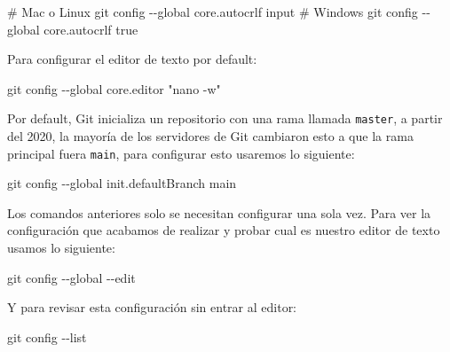\documentclass[
  spanish,
  12pt,
  letterpaper,
  DIV=11,
  numbers=noendperiod]{scrreprt}
\newenvironment{Shaded}{\begin{snugshade}}{\end{snugshade}}
\newcommand{\AttributeTok}[1]{\textcolor[rgb]{0.40,0.45,0.13}{#1}}
\newcommand{\CommentTok}[1]{\textcolor[rgb]{0.37,0.37,0.37}{#1}}
\newcommand{\FunctionTok}[1]{\textcolor[rgb]{0.28,0.35,0.67}{#1}}
\newcommand{\NormalTok}[1]{\textcolor[rgb]{0.00,0.23,0.31}{#1}}
\newcommand{\StringTok}[1]{\textcolor[rgb]{0.13,0.47,0.30}{#1}}
\begin{document}
\begin{Shaded}
\begin{Highlighting}[]
\CommentTok{\# Mac o Linux}
\FunctionTok{git}\NormalTok{ config }\AttributeTok{{-}{-}global}\NormalTok{ core.autocrlf input}
\CommentTok{\# Windows}
\FunctionTok{git}\NormalTok{ config }\AttributeTok{{-}{-}global}\NormalTok{ core.autocrlf true}
\end{Highlighting}
\end{Shaded}

Para configurar el editor de texto por default:

\begin{Shaded}
\begin{Highlighting}[]
\FunctionTok{git}\NormalTok{ config }\AttributeTok{{-}{-}global}\NormalTok{ core.editor }\StringTok{"nano {-}w"}
\end{Highlighting}
\end{Shaded}

Por default, Git inicializa un repositorio con una rama llamada
\texttt{master}, a partir del 2020, la mayoría de los servidores de Git
cambiaron esto a que la rama principal fuera \texttt{main}, para
configurar esto usaremos lo siguiente:

\begin{Shaded}
\begin{Highlighting}[]
\FunctionTok{git}\NormalTok{ config }\AttributeTok{{-}{-}global}\NormalTok{ init.defaultBranch main}
\end{Highlighting}
\end{Shaded}

Los comandos anteriores solo se necesitan configurar una sola vez. Para
ver la configuración que acabamos de realizar y probar cual es nuestro
editor de texto usamos lo siguiente:

\begin{Shaded}
\begin{Highlighting}[]
\FunctionTok{git}\NormalTok{ config }\AttributeTok{{-}{-}global} \AttributeTok{{-}{-}edit}
\end{Highlighting}
\end{Shaded}

Y para revisar esta configuración sin entrar al editor:

\begin{Shaded}
\begin{Highlighting}[]
\FunctionTok{git}\NormalTok{ config }\AttributeTok{{-}{-}list}
\end{Highlighting}
\end{Shaded}
\end{document}

